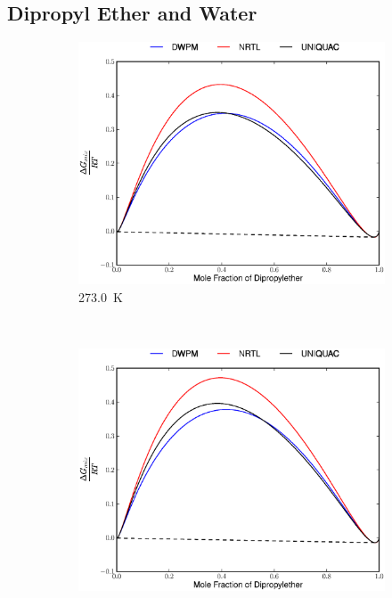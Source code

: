 \subsection{Dipropyl Ether and Water}
\vspace*{\fill}
\begin{figure}[hp]
\begin{subfigure}[h]{0.5\textwidth}
	\centering
	\includegraphics[width = \textwidth]{Results_Parts/BinaryParams/dipropylether-water/AllModelsGibbsPlots/T_273.eps}
	\caption{273.0~$\mathrm{K}$} 
\end{subfigure}%
~%
\begin{subfigure}[h]{0.5\textwidth}
	\centering
	\includegraphics[width = \textwidth]{Results_Parts/BinaryParams/dipropylether-water/AllModelsGibbsPlots/T_283.eps}

\end{subfigure}
\end{figure}
